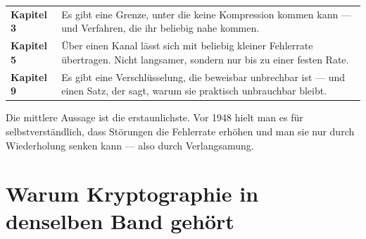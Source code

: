 \begin{merksatz}
\begin{center}
{\small
\renewcommand{\arraystretch}{1.55}
\begin{tabular}{@{}P{2.4cm}P{6.2cm}@{}}
\toprule
\textbf{Kapitel 3} & Es gibt eine Grenze, unter die keine Kompression kommen kann --- und Verfahren, die ihr beliebig nahe kommen.\\
\textbf{Kapitel 5} & Über einen  Kanal lässt sich mit beliebig kleiner Fehlerrate übertragen. Nicht langsamer, sondern nur bis zu einer festen Rate.\\
\textbf{Kapitel 9} & Es gibt eine Verschlüsselung, die beweisbar unbrechbar ist --- und einen Satz, der sagt, warum sie praktisch unbrauchbar bleibt.\\
\bottomrule
\end{tabular}}
\end{center}

\begin{center}
\begin{minipage}{0.9\textwidth}
Die mittlere Aussage ist die erstaunlichste. Vor 1948 hielt man es für selbstverständlich, dass Störungen die Fehlerrate erhöhen und man sie nur durch Wiederholung senken kann --- also durch Verlangsamung.
\end{minipage}
\end{center}

\begin{center}
\begin{minipage}{0.88\textwidth}
\end{minipage}
\end{center}
\end{merksatz}

\section*{Warum Kryptographie in denselben Band gehört}

